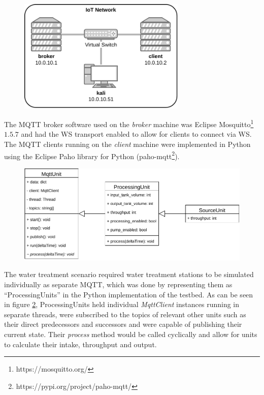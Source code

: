 \begin{figure}[h]
    \centering
    \includegraphics[width=8cm]{img/ch04/Testbed2.pdf}
    \label{fig:testbed-network}
\end{figure}
The \ac{MQTT} broker software used on the \emph{broker} machine was Eclipse Mosquitto\footnote{https://mosquitto.org/} $1.5.7$ and had the \ac{WS} transport enabled to allow for clients to connect via \ac{WS}. The \ac{MQTT} clients running on the \emph{client} machine were implemented in Python using the Eclipse Paho library for Python (paho-mqtt\footnote{https://pypi.org/project/paho-mqtt/}).\par %
\begin{figure}[h]
    \centering
    \includegraphics[width=14cm]{img/ch04/Testbed-Unit.pdf}
    \label{fig:testbed-unit}
\end{figure}
The water treatment scenario required water treatment stations to be simulated individually as separate \ac{MQTT}, which was done by representing them as \enquote{ProcessingUnits} in the Python implementation of the testbed. As can be seen in figure \ref{fig:testbed-unit}, ProcessingUnits held individual \emph{MqttClient} instances running in separate threads, were subscribed to the topics of relevant other units such as their direct predecessors and successors and were capable of publishing their current state. Their \emph{process} method would be called cyclically and allow for units to calculate their intake, throughput and output.

